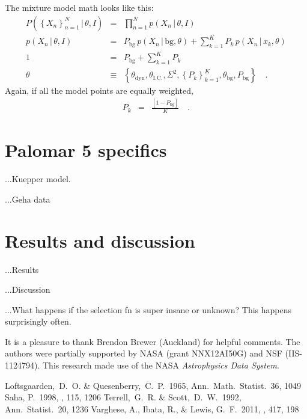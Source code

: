 \documentclass[12pt,pdftex,preprint]{aastex}
\newcommand{\setof}[1]{\left\{{#1}\right\}}
\newcommand{\given}{\,|\,}
\newcommand{\bg}{\mathrm{bg}}
\newcommand{\dyn}{\mathrm{dyn}}
\newcommand{\ic}{\mathrm{I.C.}}
\begin{document}
The mixture model math looks like this:
\begin{eqnarray}
P(\setof{X_n}_{n=1}^N\given\theta,I) &=& \prod_{n=1}^N p(X_n\given\theta,I)
\\
p(X_n\given\theta,I) &=& P_\bg\,p(X_n\given \bg,\theta) + \sum_{k=1}^K P_k\,p(X_n\given x_k,\theta)
\\
1 &=& P_\bg + \sum_{k=1}^K P_k
\\
\theta &\equiv& \setof{\theta_\dyn, \theta_\ic, \Sigma^2, \setof{P_k}_{k=1}^K, \theta_\bg, P_\bg}
\quad .
\end{eqnarray}
Again, if all the model points are equally weighted,
\begin{eqnarray}
P_k &=& \frac{[1 - P_\bg]}{K}
\quad .
\end{eqnarray}

\section{Palomar 5 specifics}

...Kuepper model.

...Geha data

\section{Results and discussion}

...Results

...Discussion

...What happens if the selection fn is super insane or unknown?  This
happens surprisingly often.

\acknowledgements It is a pleasure to thank
  Brendon Brewer (Auckland)
for helpful comments.  The authors were partially supported by NASA
(grant NNX12AI50G) and NSF (IIS-1124794).  This research made use of
the NASA \textsl{Astrophysics Data System}.

\begin{thebibliography}{}
  Loftsgaarden,~D.~O. \& Quesenberry,~C.~P.\ 1965, Ann.\ Math.\ Statist.\ 36, 1049
  Saha, P.\ 1998, \aj, 115, 1206 
  Terrell,~G.~R. \& Scott,~D.~W.\ 1992, Ann.\ Statist.\ 20, 1236
  Varghese, A., Ibata, R., \& Lewis, G.~F.\ 2011, \mnras, 417, 198 
\end{thebibliography}
\end{document}
